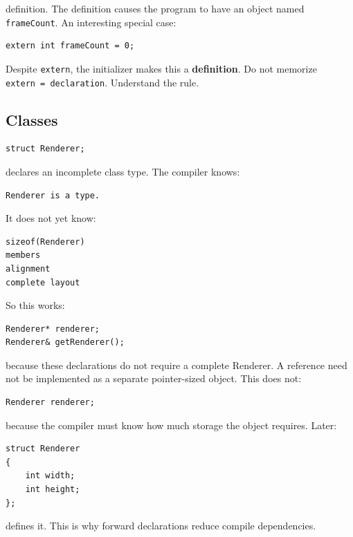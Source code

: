 definition. The definition causes the program to have an object named \texttt{frameCount}. An interesting special case:

\begin{verbatim}
extern int frameCount = 0;
\end{verbatim}

Despite \texttt{extern}, the initializer makes this a \textbf{definition}. Do not memorize \texttt{extern\ =\ declaration}. Understand the rule.

\subsection{Classes}\label{05-engine-i-ch002-classes}

\hypertarget{05-engine-i-ch002-classes}{}

\begin{verbatim}
struct Renderer;
\end{verbatim}

declares an incomplete class type. The compiler knows:

\begin{verbatim}
Renderer is a type.
\end{verbatim}

It does not yet know:

\begin{verbatim}
sizeof(Renderer)
members
alignment
complete layout
\end{verbatim}

So this works:

\begin{verbatim}
Renderer* renderer;
Renderer& getRenderer();
\end{verbatim}

because these declarations do not require a complete Renderer. A reference need not be implemented as a separate pointer-sized object. This does not:

\begin{verbatim}
Renderer renderer;
\end{verbatim}

because the compiler must know how much storage the object requires. Later:

\begin{verbatim}
struct Renderer
{
    int width;
    int height;
};
\end{verbatim}

defines it. This is why forward declarations reduce compile dependencies.

